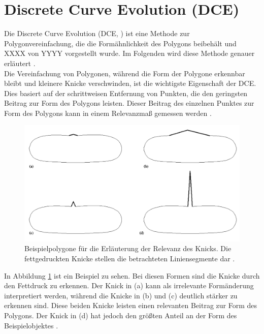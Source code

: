 \section{Discrete Curve Evolution (DCE)}
\label{sec:Discrete Curve Evolution}
{Die \glqq Discrete Curve Evolution\grqq{} (DCE, \cite{Latecki1999a,Latecki1999c}) ist eine Methode zur Polygonvereinfachung, die die Formähnlichkeit des Polygons beibehält und XXXX von YYYY vorgestellt wurde. Im Folgenden wird diese Methode genauer erläutert \citep{Barkowsky2000}. 
\\
Die Vereinfachung von Polygonen, während die Form der Polygone erkennbar bleibt und kleinere Knicke verschwinden, ist die wichtigste Eigenschaft der DCE. Dies basiert auf der schrittweisen Entfernung von Punkten, die den geringsten Beitrag zur Form des Polygons leisten. Dieser Beitrag des einzelnen Punktes zur Form des Polygons kann in einem Relevanzmaß gemessen werden \citep{Barkowsky2000}. 
\\
\begin{figure}[ht]
	   \centering
	   \includegraphics*[scale = 0.8, keepaspectratio, trim=2 2 2 2 ]{images/schem_maps_paper_kinks.png}
	   \caption[Beispielpolygone für die Erläuterung der Relevanz des Knicks]{Beispielpolygone für die Erläuterung der Relevanz des Knicks. Die fettgedruckten Knicke stellen die betrachteten Liniensegmente dar \citep{Barkowsky2000}.} 
	   \label{Bsp_Rev_Measur_K}
\end{figure}In Abbildung \ref{Bsp_Rev_Measur_K} ist ein Beispiel zu sehen. Bei diesen Formen sind die Knicke durch den Fettdruck zu erkennen. Der Knick in (a) kann als irrelevante Formänderung interpretiert werden, während die Knicke in (b) und (c) deutlich stärker zu erkennen sind. Diese beiden Knicke leisten einen relevanten Beitrag zur Form des Polygons. Der Knick in (d) hat jedoch den größten Anteil an der Form des Beispielobjektes \citep{Barkowsky2000}. 
}
